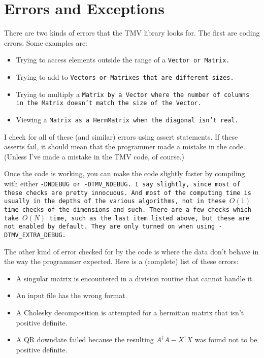 
\section{Errors and Exceptions}
\label{Exceptions}

There are two kinds of errors that the TMV library looks for.  The first are 
coding errors.  Some examples are:
\begin{itemize}
\item
Trying to access elements outside the range of a \tt{Vector} or \tt{Matrix}.
\item
Trying to add to \tt{Vector}s or \tt{Matrix}es that are different sizes.
\item
Trying to multiply a \tt{Matrix} by a \tt{Vector} where the number of columns 
in the \tt{Matrix} doesn't match the size of the \tt{Vector}.
\item
Viewing a \tt{Matrix} as a \tt{HermMatrix} when the diagonal isn't real.
\end{itemize}
I check for all of these (and similar) errors using assert statements.
If these asserts fail, it should mean that
the programmer made a mistake in the code.  (Unless I've made a 
mistake in the TMV code, of course.)

Once the code is working, you can make the code slightly faster by 
compiling with either \tt{-DNDEBUG} or \tt{-DTMV\_NDEBUG}.  I say slightly, since most of these checks 
are pretty innocuous.  And most of the computing time is usually in the depths
of the various algorithms, not in these $O(1)$ time checks of the dimensions and such.  
There are a few checks which take $O(N)$ time, such as the last item listed above, but these are not enabled by default.  They are only turned on when using \tt{-DTMV\_EXTRA\_DEBUG}.

The other kind of error checked for by the code is 
where the data don't behave in the way
the programmer expected.  Here is a (complete) list of these errors:
\begin{itemize}
\item
A singular matrix is encountered in a division routine that cannot handle it.
\item
An input file has the wrong format.
\item
A Cholesky decomposition is attempted for a hermitian matrix that isn't positive definite.
\item
A QR downdate failed because the resulting $A^\dagger A - X^\dagger X$ was found not to be positive definite.
\end{itemize}

